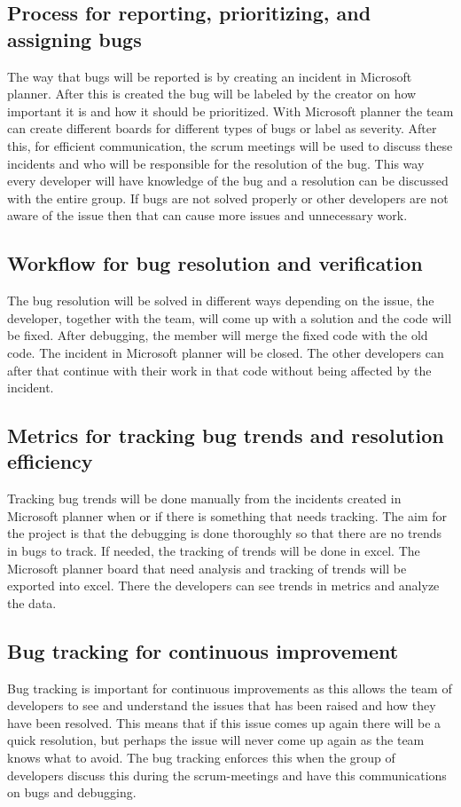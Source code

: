 \documentclass{article}
\begin{document}
\subsection{Process for reporting, prioritizing, and assigning bugs}
The way that bugs will be reported is by creating an incident in Microsoft planner. After this is created the bug will be labeled by the creator on how important it is and how it should be prioritized. With Microsoft planner the team can create different boards for different types of bugs or label as severity. After this, for efficient communication, the scrum meetings will be used to discuss these incidents and who will be responsible for the resolution of the bug. This way every developer will have knowledge of the bug and a resolution can be discussed with the entire group. If bugs are not solved properly or other developers are not aware of the issue then that can cause more issues and unnecessary work.


\subsection{Workflow for bug resolution and verification}
The bug resolution will be solved in different ways depending on the issue, the developer, together with the team, will come up with a solution and the code will be fixed. After debugging, the member will merge the fixed code with the old code. The incident in Microsoft planner will be closed. The other developers can after that continue with their work in that code without being affected by the incident. 


\subsection{Metrics for tracking bug trends and resolution efficiency}
Tracking bug trends will be done manually from the incidents created in Microsoft planner when or if there is something that needs tracking. The aim for the project is that the debugging is done thoroughly so that there are no trends in bugs to track. If needed,  the tracking of trends will be done in excel. The Microsoft planner board that need analysis and tracking of trends will be exported into excel. There the developers can see trends in metrics and analyze the data. 


\subsection{Bug tracking for continuous improvement}
Bug tracking is important for continuous improvements as this allows the team of developers to see and understand the issues that has been raised and how they have been resolved. This means that if this issue comes up again there will be a quick resolution, but perhaps the issue will never come up again as the team knows what to avoid. The bug tracking enforces this when the group of developers discuss this during the scrum-meetings and have this communications on bugs and debugging.
\end{document}
